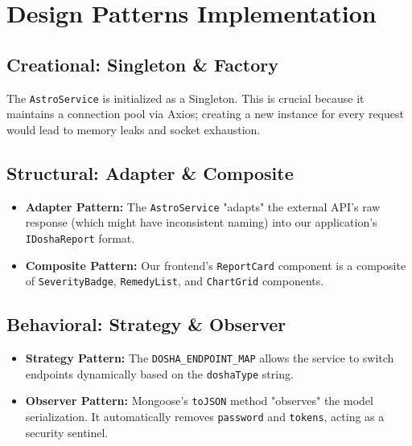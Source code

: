 \documentclass[12pt,a4paper]{article}
\begin{document}
\section{Design Patterns Implementation}

\subsection{Creational: Singleton \& Factory}
The \texttt{AstroService} is initialized as a Singleton. This is crucial because it maintains a connection pool via Axios; creating a new instance for every request would lead to memory leaks and socket exhaustion.

\subsection{Structural: Adapter \& Composite}
\begin{itemize}
    \item \textbf{Adapter Pattern:} The \texttt{AstroService} "adapts" the external API's raw response (which might have inconsistent naming) into our application's \texttt{IDoshaReport} format.
    \item \textbf{Composite Pattern:} Our frontend's \texttt{ReportCard} component is a composite of \texttt{SeverityBadge}, \texttt{RemedyList}, and \texttt{ChartGrid} components.
\end{itemize}

\subsection{Behavioral: Strategy \& Observer}
\begin{itemize}
    \item \textbf{Strategy Pattern:} The \texttt{DOSHA\_ENDPOINT\_MAP} allows the service to switch endpoints dynamically based on the \texttt{doshaType} string.
    \item \textbf{Observer Pattern:} Mongoose's \texttt{toJSON} method "observes" the model serialization. It automatically removes \texttt{password} and \texttt{tokens}, acting as a security sentinel.
\end{itemize}
\end{document}
